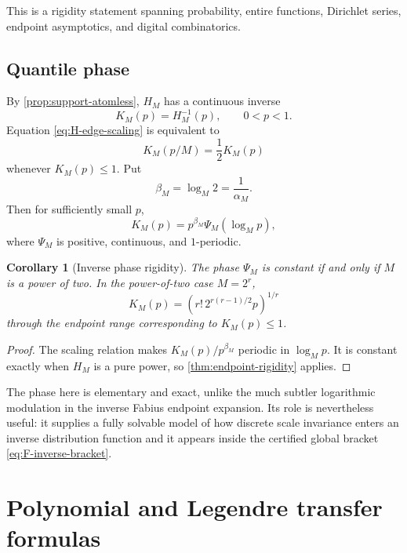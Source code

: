 \documentclass[11pt,oneside]{article}
\newtheorem{corollary}[theorem]{Corollary}
\theoremstyle{definition}
\theoremstyle{remark}
\numberwithin{equation}{section}
\newcommand{\1}{\mathbf 1}
\begin{document}
This is a rigidity statement spanning probability, entire functions, Dirichlet series,
endpoint asymptotics, and digital combinatorics.

\subsection{Quantile phase}

By \cref{prop:support-atomless}, $H_M$ has a continuous inverse
\begin{equation}
 K_M(p)=H_M^{-1}(p),
 \qquad 0<p<1.
 \label{eq:KM}
\end{equation}
Equation \eqref{eq:H-edge-scaling} is equivalent to
\begin{equation}
 K_M(p/M)=\frac12K_M(p)
 \label{eq:K-scaling}
\end{equation}
whenever $K_M(p)\le1$.  Put
\begin{equation}
 \beta_M=\log_M2=\frac1{\alpha_M}.
 \label{eq:betaM}
\end{equation}
Then for sufficiently small $p$,
\begin{equation}
 K_M(p)=p^{\beta_M}\Psi_M(\log_Mp),
 \label{eq:K-log-periodic}
\end{equation}
where $\Psi_M$ is positive, continuous, and $1$-periodic.

\begin{corollary}[Inverse phase rigidity]
\label{cor:inverse-phase}
The phase $\Psi_M$ is constant if and only if $M$ is a power of two.  In the power-of-two
case $M=2^r$,
\begin{equation}
 K_M(p)=
 \left(r!\,2^{r(r-1)/2}p\right)^{1/r}
 \label{eq:K-power-two}
\end{equation}
through the endpoint range corresponding to $K_M(p)\le1$.
\end{corollary}

\begin{proof}
The scaling relation makes $K_M(p)/p^{\beta_M}$ periodic in $\log_Mp$.  It is constant
exactly when $H_M$ is a pure power, so \cref{thm:endpoint-rigidity} applies.
\end{proof}

The phase here is elementary and exact, unlike the much subtler logarithmic modulation in
the inverse Fabius endpoint expansion.  Its role is nevertheless useful: it supplies a fully
solvable model of how discrete scale invariance enters an inverse distribution function and
it appears inside the certified global bracket \eqref{eq:F-inverse-bracket}.

\section{Polynomial and Legendre transfer formulas}
\label{sec:legendre}
\end{document}
